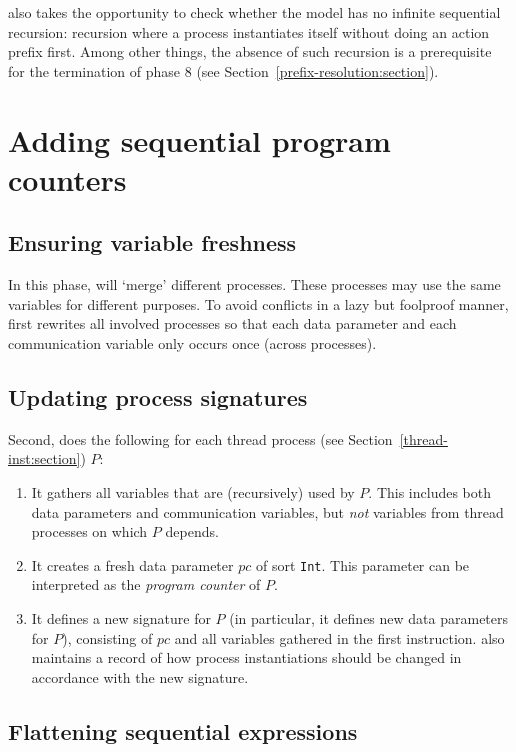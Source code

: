 \lpeq{} also takes the opportunity to check whether the model has no infinite sequential recursion: recursion where a process instantiates itself without doing an action prefix first.
Among other things, the absence of such recursion is a prerequisite for the termination of phase 8 (see Section~\ref{prefix-resolution:section}).

\section{Adding sequential program counters}

\subsection{Ensuring variable freshness}

In this phase, \lpeq{} will `merge' different processes.
These processes may use the same variables for different purposes.
To avoid conflicts in a lazy but foolproof manner, \lpeq{} first rewrites all involved processes so that each data parameter and each communication variable only occurs once (across processes).

\subsection{Updating process signatures}

Second, \lpeq{} does the following for each thread process (see Section~\ref{thread-inst:section}) $P$:
\begin{enumerate}[1.]
\item It gathers all variables that are (recursively) used by $P$.
This includes both data parameters and communication variables, but \emph{not} variables from thread processes on which $P$ depends.
\item It creates a fresh data parameter $\textit{pc}$ of sort \texttt{Int}.
This parameter can be interpreted as the \emph{program counter} of $P$.
\item It defines a new signature for $P$ (in particular, it defines new data parameters for $P$), consisting of $\textit{pc}$ and all variables gathered in the first instruction.
\lpeq{} also maintains a record of how process instantiations should be changed in accordance with the new signature.
\end{enumerate}

\subsection{Flattening sequential expressions} \label{flattenseqexprs:section}

